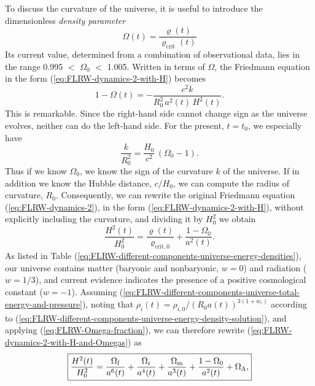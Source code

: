 To discuss the curvature of the universe, it is useful to introduce the dimensionless \emph{density parameter}
\begin{equation}
	\Omega(t)
	= \frac{\varrho(t)}{\varrho_{\mathrm{crit}}(t)}
\end{equation}
Its current value, determined from a combination of observational data, lies in the range 0.995 $<$ $\Omega_0$ $<$ 1.005. Written in terms of $\Omega$, the Friedmann equation in the form (\ref{eq:FLRW-dynamics-2-with-H}) becomes
\begin{equation}
	1 - \Omega(t)
	= - \frac{c^2 k}{R_0^2 \, a^2(t) \, H^2(t)}
	.
\end{equation}
This is remarkable. Since the right-hand side cannot change sign as the universe evolves, neither can do the left-hand side. For the present, $t=t_0$, we especially have
\begin{equation}
	\frac{k}{R_0^2}
	= \frac{H_0}{c^2} \, (\Omega_0 - 1)
	.
\end{equation}
Thus if we know $\Omega_0$, we know the sign of the curvature $k$ of the universe. If in addition we know the Hubble distance, $c/H_0$, we can compute the radius of curvature, $R_0$. %
Consequently, we can rewrite the original Friedmann equation (\ref{eq:FLRW-dynamics-2}), in the form (\ref{eq:FLRW-dynamics-2-with-H}), without explicitly including the curvature, and dividing it by $H_0^2$ we obtain
\begin{equation}
	\frac{H^2(t)}{H_0^2}
	= \frac{\varrho(t)}{\varrho_{\mathrm{crit}, 0}} + 
	\frac{1-\Omega_0}{a^2(t)}
	.
	\label{eq:FLRW-dynamics-2-with-H-and-Omegas}
\end{equation}
As listed in Table (\ref{eq:FLRW-different-components-universe-energy-densities}), our universe contains matter (baryonic and nonbaryonic, $w=0$) and radiation ($w=1/3$), and current evidence indicates the presence of a positive cosmological constant ($w=-1$).
Assuming %
(\ref{eq:FLRW-different-components-universe-total-energy-and-pressure}), noting that $\rho_i(t) = \rho_{i,0} / (R_0 a(t))^{3(1+w_i)}$ according to (\ref{eq:FLRW-different-components-universe-energy-density-solution}), and applying (\ref{eq:FLRW-Omega-fraction}), we can therefore rewrite (\ref{eq:FLRW-dynamics-2-with-H-and-Omegas}) as
\begin{equation}
	\fbox{$\displaystyle
	\frac{H^2(t)}{H_0^2}
	= 
	\frac{\Omega_{\mathrm{f}}}{a^6(t)}  %
	+ \frac{\Omega_{\mathrm{r}}}{a^4(t)}
	+ \frac{\Omega_{\mathrm{m}}}{a^3(t)}
	+ \frac{1-\Omega_0}{a^2(t)}
	+ \Omega_{\Lambda}
	,
	$}
	\label{eq:FLRW-dynamics-2-with-H-and-Omegas-2}
\end{equation}
